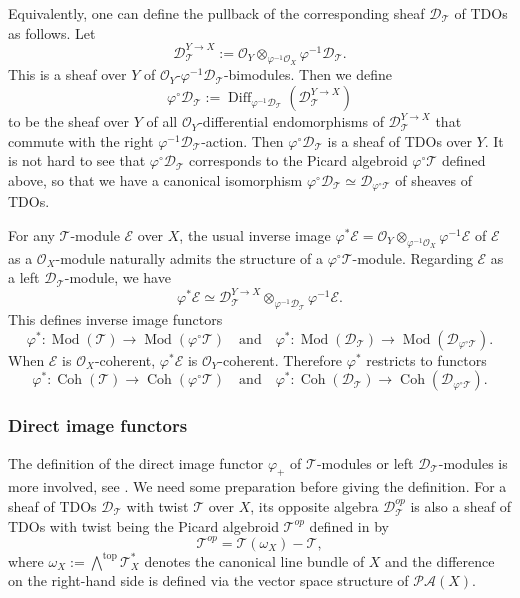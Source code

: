 \documentclass[11pt, a4paper]{amsart}
\newcommand{\cE}{\mathcal{E}}
\newcommand{\sD}{\mathscr{D}}
\DeclareMathOperator{\Diff}{Diff}
\DeclareMathOperator{\Mod}{Mod}
\DeclareMathOperator{\Coh}{Coh}
\newcommand{\T}{\mathcal{T}}
\newcommand{\TT}{\mathscr{T}}
\newcommand{\PicAlg}{\mathscr{PA}}
\newcommand{\OO}{\mathcal{O}}
\theoremstyle{definition}
\numberwithin{equation}{section}
\begin{document}
Equivalently, one can define the pullback of the corresponding sheaf $\sD_\TT$ of TDOs as follows. Let 
\[ 
	\sD_\TT^{Y \to X} := \OO_Y \otimes_{\varphi^{-1} \OO_X} \varphi^{-1} \sD_\TT.
\]
This is a sheaf over $Y$ of $\OO_Y$-$\varphi^{-1} \sD_\TT$-bimodules. Then we define 
\[ 
\varphi^\circ \sD_\TT := \Diff_{\varphi^{-1} \sD_\TT} (\sD_\TT^{Y \to X}) 
\]
to be the sheaf over $Y$ of all $\OO_Y$-differential endomorphisms of $\sD_\TT^{Y \to X}$ that commute with the right $\varphi^{-1} \sD_\TT$-action. Then $\varphi^\circ \sD_\TT$ is a sheaf of TDOs over $Y$. It is not hard to see that $\varphi^\circ \sD_\TT$ corresponds to the Picard algebroid $\varphi^\circ \TT$ defined above, so that we have a canonical isomorphism $\varphi^\circ \sD_\TT \simeq \sD_{\varphi^\circ \TT}$ of sheaves of TDOs. 

For any $\TT$-module $\cE$ over $X$, the usual inverse image $\varphi^*\cE = \OO_Y \otimes_{\varphi^{-1} \OO_X} \varphi^{-1} \cE$ of $\cE$ as a $\OO_X$-module naturally admits the structure of a $\varphi^\circ \TT$-module. Regarding $\cE$ as a left $\sD_\TT$-module, we have 
	\[ \varphi^*\cE \simeq \sD_{\TT}^{Y \to X} \otimes_{\varphi^{-1} \sD_\TT} \varphi^{-1} \cE. \] 
This defines inverse image functors 
	\[ \varphi^*: \Mod(\TT) \to \Mod(\varphi^\circ \TT) \quad \text{and} \quad \varphi^*: \Mod(\sD_\TT) \to \Mod(\sD_{\varphi^\circ \TT}). \] 
When $\cE$ is $\OO_X$-coherent, $\varphi^*\cE$ is $\OO_Y$-coherent. Therefore $\varphi^*$ restricts to functors 
	\[ \varphi^*: \Coh(\TT) \to \Coh(\varphi^\circ \TT) \quad \text{and} \quad \varphi^*: \Coh(\sD_\TT) \to \Coh(\sD_{\varphi^\circ \TT}). \]

\subsubsection{Direct image functors} \label{subsubsec:pushforward_pic}

The definition of the direct image functor $\varphi_+$ of $\TT$-modules or left $\sD_\TT$-modules is more involved, see \cite[Section 1.3]{HTT:D-modules}. We need some preparation before giving the definition. For a sheaf of TDOs $\sD_\TT$ with twist $\TT$ over $X$, its opposite algebra $\sD_\TT^{op}$ is also a sheaf of TDOs with twist being the Picard algebroid $\TT^{op}$ defined in \cite[Section 2.4]{BeilinsonBernstein} by
\begin{equation}\label{eq:TTop}
	\TT^{op} = \TT(\omega_X) - \TT,
\end{equation}
where $\omega_X := \bigwedge^{\mathrm{top}}\T_X^*$ denotes the canonical line bundle of $X$ and the difference on the right-hand side is defined via the vector space structure of $\PicAlg(X)$. 
\end{document}
